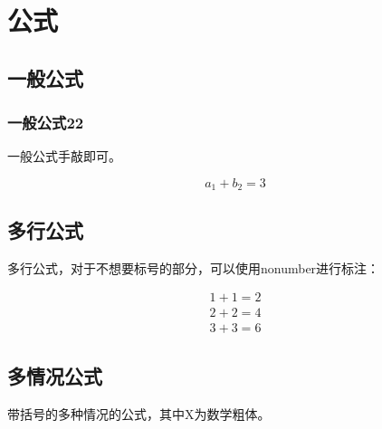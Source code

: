 \section{公式}

\subsection{一般公式}
\subsubsection{一般公式22}

一般公式手敲即可。



\begin{equation}\label{eq:sip}
    a_1 + b_2 = 3
\end{equation}


\subsection{多行公式}

多行公式，对于不想要标号的部分，可以使用nonumber进行标注：


\begin{gather}\label{eq:add}
    1+1=2 \\
    2+2=4 \\
    3+3=6 \nonumber
\end{gather}

\subsection{多情况公式}
带括号的多种情况的公式，其中X为数学粗体。


